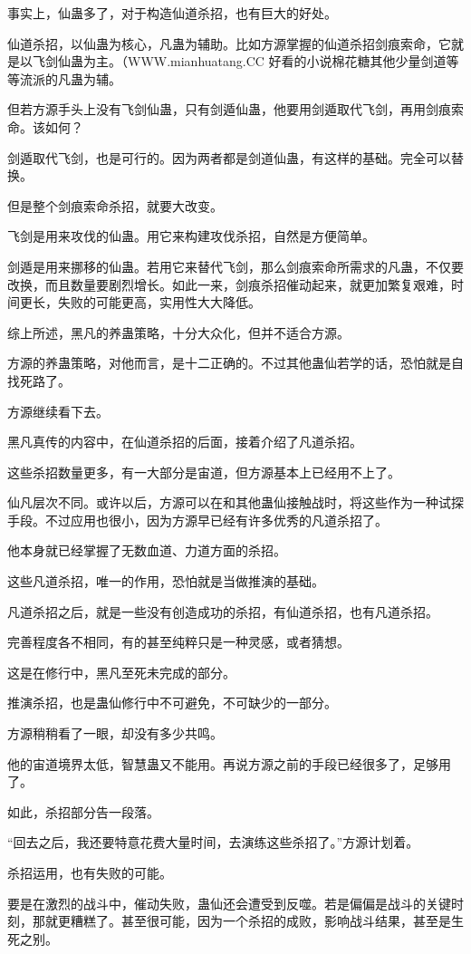 \begin{this_body}
事实上，仙蛊多了，对于构造仙道杀招，也有巨大的好处。

仙道杀招，以仙蛊为核心，凡蛊为辅助。比如方源掌握的仙道杀招剑痕索命，它就是以飞剑仙蛊为主。（WWW.mianhuatang.CC 好看的小说棉花糖其他少量剑道等等流派的凡蛊为辅。

但若方源手头上没有飞剑仙蛊，只有剑遁仙蛊，他要用剑遁取代飞剑，再用剑痕索命。该如何？

剑遁取代飞剑，也是可行的。因为两者都是剑道仙蛊，有这样的基础。完全可以替换。

但是整个剑痕索命杀招，就要大改变。

飞剑是用来攻伐的仙蛊。用它来构建攻伐杀招，自然是方便简单。

剑遁是用来挪移的仙蛊。若用它来替代飞剑，那么剑痕索命所需求的凡蛊，不仅要改换，而且数量要剧烈增长。如此一来，剑痕杀招催动起来，就更加繁复艰难，时间更长，失败的可能更高，实用性大大降低。

综上所述，黑凡的养蛊策略，十分大众化，但并不适合方源。

方源的养蛊策略，对他而言，是十二正确的。不过其他蛊仙若学的话，恐怕就是自找死路了。

方源继续看下去。

黑凡真传的内容中，在仙道杀招的后面，接着介绍了凡道杀招。

这些杀招数量更多，有一大部分是宙道，但方源基本上已经用不上了。

仙凡层次不同。或许以后，方源可以在和其他蛊仙接触战时，将这些作为一种试探手段。不过应用也很小，因为方源早已经有许多优秀的凡道杀招了。

他本身就已经掌握了无数血道、力道方面的杀招。

这些凡道杀招，唯一的作用，恐怕就是当做推演的基础。

凡道杀招之后，就是一些没有创造成功的杀招，有仙道杀招，也有凡道杀招。

完善程度各不相同，有的甚至纯粹只是一种灵感，或者猜想。

这是在修行中，黑凡至死未完成的部分。

推演杀招，也是蛊仙修行中不可避免，不可缺少的一部分。

方源稍稍看了一眼，却没有多少共鸣。

他的宙道境界太低，智慧蛊又不能用。再说方源之前的手段已经很多了，足够用了。

如此，杀招部分告一段落。

“回去之后，我还要特意花费大量时间，去演练这些杀招了。”方源计划着。

杀招运用，也有失败的可能。

要是在激烈的战斗中，催动失败，蛊仙还会遭受到反噬。若是偏偏是战斗的关键时刻，那就更糟糕了。甚至很可能，因为一个杀招的成败，影响战斗结果，甚至是生死之别。


\end{this_body}
